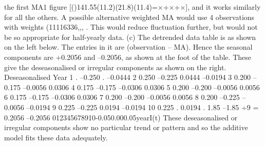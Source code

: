 \documentclass[a4paper,12pt]{article}
\begin{document}
\begin{enumerate}
the first MA1 figure [()141.55(11.2)(21.8)(11.4)=×+×+×], and it works similarly for all the others.
A possible alternative weighted MA would use 4 observations with weights (11116336,,, . This would reduce fluctuation further, but would not be so appropriate for half-yearly data.
(c) The detrended data table is as shown on the left below. The entries in it are (observation – MA). Hence the seasonal components are +0.2056 and –0.2056, as shown at the foot of the table. These give the deseasonalised or irregular components as shown on the right.
Deseasonalised
Year 1
.
–0.250
.
–0.0444
2
0.250
–0.225
0.0444
–0.0194
3
0.200
–0.175
–0.0056
0.0306
4
0.175
–0.175
–0.0306
0.0306
5
0.200
–0.200
–0.0056
0.0056
6
0.175
–0.175
–0.0306
0.0306
7
0.200
–0.200
–0.0056
0.0056
8
0.200
–0.225
–0.0056
–0.0194
9
0.225
–0.225
0.0194
–0.0194
10
0.225
.
0.0194
.
1.85
–1.85
÷9 =
0.2056
–0.2056
012345678910-0.050.000.05yearI(t)
These deseasonalised or irregular components show no particular trend or pattern and so the additive model fits these data adequately.
\end{enumerate}
\end{document}
